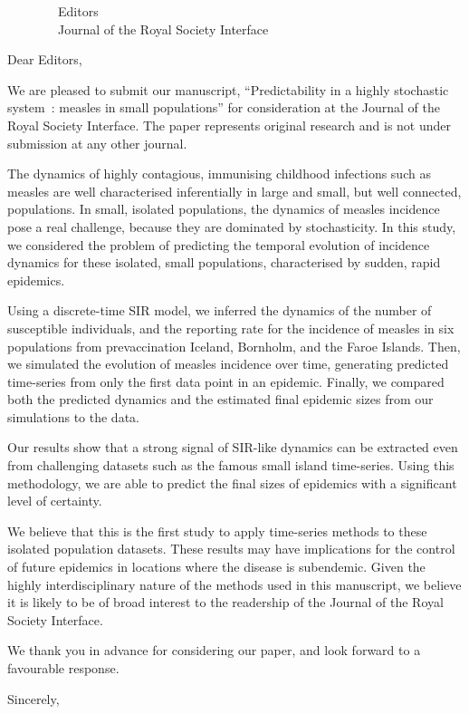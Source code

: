 \documentclass[fromalign=right,backaddress=false, fontsize=10pt]{scrlttr2}
\begin{document}
 
\begin{letter}{$\qquad\qquad$\small Editors \\ \small $\qquad\qquad$Journal of the Royal Society Interface} 
  \opening{Dear Editors,} 
  We are pleased to submit our manuscript, ``Predictability in a highly stochastic system~: measles in small populations'' for consideration at the Journal of the Royal Society Interface. The paper represents original research and is not under submission at any other journal.
  \vspace{0.2cm}
  
  The dynamics of highly contagious, immunising childhood infections such as measles are well characterised inferentially in large and small, but well connected, populations. In small, isolated populations, the dynamics of measles incidence pose a real challenge, because they are dominated by stochasticity. In this study, we considered the problem of predicting the temporal evolution of incidence dynamics for these isolated, small populations, characterised by sudden, rapid epidemics. 
    \vspace{0.2cm}
  
  Using a discrete-time SIR model, we inferred the dynamics of the number of susceptible individuals, and the reporting rate for the incidence of measles in six populations from prevaccination Iceland, Bornholm, and the Faroe Islands. Then, we simulated the evolution of measles incidence over time, generating predicted time-series from only the first data point in an epidemic. Finally, we compared both the predicted dynamics and the estimated final epidemic sizes from our simulations to the data. 
      \vspace{0.2cm}
      
  Our results show that a strong signal of SIR-like dynamics can be extracted even from challenging datasets such as the famous small island time-series. Using this methodology, we are able to predict the final sizes of epidemics with a significant level of certainty. 
    \vspace{0.2cm}

We believe that this is the first study to apply time-series methods to these isolated population datasets. These results may have implications for the control of future epidemics in locations where the disease is subendemic. Given the highly interdisciplinary nature of the methods used in this manuscript, we believe it is likely to be of broad interest to the readership of the Journal of the Royal Society Interface.
    \vspace{0.2cm}

We thank you in advance for considering our paper, and look forward to a favourable response.


  
  
  
  \closing{Sincerely,}
\end{letter} 
\end{document}
